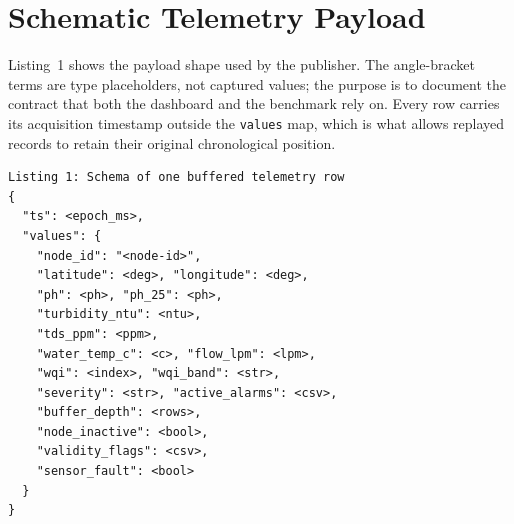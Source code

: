 \documentclass[conference]{IEEEtran}
\begin{document}
\section{Schematic Telemetry Payload}
\label{app:payload-schema}

Listing~1 shows the payload shape used by the publisher. The angle-bracket
terms are type placeholders, not captured values; the purpose is to document the
contract that both the dashboard and the benchmark rely on. Every row carries
its acquisition timestamp outside the \texttt{values} map, which is what allows
replayed records to retain their original chronological position.

{\tiny
\begin{verbatim}
Listing 1: Schema of one buffered telemetry row
{
  "ts": <epoch_ms>,
  "values": {
    "node_id": "<node-id>",
    "latitude": <deg>, "longitude": <deg>,
    "ph": <ph>, "ph_25": <ph>,
    "turbidity_ntu": <ntu>,
    "tds_ppm": <ppm>,
    "water_temp_c": <c>, "flow_lpm": <lpm>,
    "wqi": <index>, "wqi_band": <str>,
    "severity": <str>, "active_alarms": <csv>,
    "buffer_depth": <rows>,
    "node_inactive": <bool>,
    "validity_flags": <csv>,
    "sensor_fault": <bool>
  }
}
\end{verbatim}
}



\end{document}
